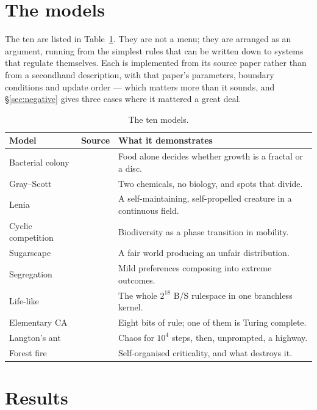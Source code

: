 \documentclass[11pt,a4paper]{article}
\begin{document}
\section{The models}

The ten are listed in Table~\ref{tab:models}. They are not a menu; they are
arranged as an argument, running from the simplest rules that can be written down
to systems that regulate themselves. Each is implemented from its source paper
rather than from a secondhand description, with that paper's parameters, boundary
conditions and update order --- which matters more than it sounds, and
\S\ref{sec:negative} gives three cases where it mattered a great deal.

\begin{table}[t]
\centering
\small
\begin{tabular}{@{}llp{7.4cm}@{}}
\toprule
\textbf{Model} & \textbf{Source} & \textbf{What it demonstrates} \\
\midrule
Bacterial colony & \cite{benjacob1994,fujikawa1989} & Food alone decides whether growth is a fractal or a disc. \\
Gray--Scott & \cite{pearson1993} & Two chemicals, no biology, and spots that divide. \\
Lenia & \cite{chan2019} & A self-maintaining, self-propelled creature in a continuous field. \\
Cyclic competition & \cite{reichenbach2007,kerr2002} & Biodiversity as a phase transition in mobility. \\
Sugarscape & \cite{epstein1996} & A fair world producing an unfair distribution. \\
Segregation & \cite{schelling1971} & Mild preferences composing into extreme outcomes. \\
Life-like & \cite{gardner1970} & The whole $2^{18}$ B/S rulespace in one branchless kernel. \\
Elementary CA & \cite{wolfram1983,cook2004} & Eight bits of rule; one of them is Turing complete. \\
Langton's ant & \cite{langton1986} & Chaos for $10^4$ steps, then, unprompted, a highway. \\
Forest fire & \cite{drossel1992,bak1987} & Self-organised criticality, and what destroys it. \\
\bottomrule
\end{tabular}
\caption{The ten models.}
\label{tab:models}
\end{table}

\section{Results}
\end{document}
